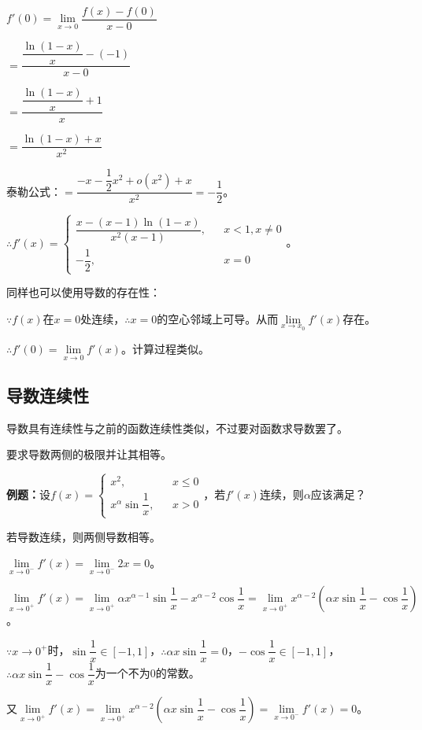 \documentclass[UTF8, 12pt]{ctexart}
\begin{document}
$f'(0)=\lim\limits_{x\to 0}\dfrac{f(x)-f(0)}{x-0}$\medskip

$=\dfrac{\dfrac{\ln(1-x)}{x}-(-1)}{x-0}$\medskip

$=\dfrac{\dfrac{\ln(1-x)}{x}+1}{x}$\medskip

$=\dfrac{\ln(1-x)+x}{x^2}$

泰勒公式：$=\dfrac{-x-\dfrac{1}{2}x^2+o(x^2)+x}{x^2}=-\dfrac{1}{2}$。\medskip

$\therefore f'(x)=\left\{\begin{array}{lcl}
    \dfrac{x-(x-1)\ln(1-x)}{x^2(x-1)}, & & x<1,x\neq 0 \\
    -\dfrac{1}{2}, & & x=0
\end{array}
\right.$。\medskip

同样也可以使用导数的存在性：

$\because f(x)$在$x=0$处连续，$\therefore x=0$的空心邻域上可导。从而$\lim\limits_{x\to x_0}f'(x)$存在。

$\therefore f'(0)=\lim\limits_{x\to 0}f'(x)$。计算过程类似。

\subsection{导数连续性}

导数具有连续性与之前的函数连续性类似，不过要对函数求导数罢了。

要求导数两侧的极限并让其相等。\medskip

\textbf{例题：}设$f(x)=\left\{\begin{array}{lcl}
    x^2, & & x\leqslant 0 \\
    x^\alpha\sin\dfrac{1}{x}, & & x>0
\end{array}
\right.$，若$f'(x)$连续，则$\alpha$应该满足？ 

若导数连续，则两侧导数相等。

$\lim\limits_{x\to 0^-}f'(x)=\lim\limits_{x\to 0^-}2x=0$。

$\lim\limits_{x\to 0^+}f'(x)=\lim\limits_{x\to 0^+}\alpha x^{\alpha-1}\sin\dfrac{1}{x}-x^{\alpha-2}\cos\dfrac{1}{x}=\lim\limits_{x\to 0^+}x^{\alpha-2}\left(\alpha x\sin\dfrac{1}{x}-\cos\dfrac{1}{x}\right)$。

$\because x\to 0^+$时，$\sin\dfrac{1}{x}\in[-1,1]$，$\therefore\alpha x\sin\dfrac{1}{x}=0$，$-\cos\dfrac{1}{x}\in[-1,1]$，$\therefore \alpha x\sin\dfrac{1}{x}-\cos\dfrac{1}{x}$为一个不为0的常数。

又$\lim\limits_{x\to 0^+}f'(x)=\lim\limits_{x\to 0^+}x^{\alpha-2}\left(\alpha x\sin\dfrac{1}{x}-\cos\dfrac{1}{x}\right)=\lim\limits_{x\to 0^-}f'(x)=0$。
\end{document}
